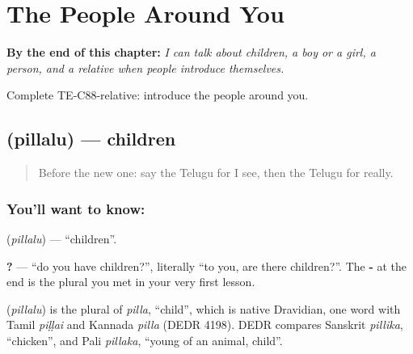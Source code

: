 
\chapter{The People Around You}
\label{ch:te-people}

\begin{chapteropening}
\textbf{By the end of this chapter:} \emph{I can talk about children, a boy or a girl, a person, and a relative when people introduce themselves.}

Complete TE-C88-relative: introduce the people around you.
\end{chapteropening}

\section[\texorpdfstring{\te{పిల్లలు} (pillalu)}{పిల్లలు (pillalu)}]{ (pillalu) — children}

\label{lesson:TE-C88-children}



\begin{quote}
Before the new one: say the Telugu for I see, then the Telugu for really.
\end{quote}

\subsection*{You'll want to know: }
\textbf{} (\emph{pillalu}) — \textquotedblleft{}children\textquotedblright{}.

\textbf{  ?} — \textquotedblleft{}do you have children?\textquotedblright{}, literally \textquotedblleft{}to you, are there children?\textquotedblright{}. The \textbf{-} at the end is the plural you met in your very first lesson.

\begin{cousinweb}
\textbf{} (\emph{pillalu}) is the plural of \emph{pilla}, \textquotedblleft{}child\textquotedblright{}, which is native Dravidian, one word with Tamil \emph{piḷḷai} and Kannada \emph{pilla} (DEDR 4198). DEDR compares Sanskrit \emph{pillika}, \textquotedblleft{}chicken\textquotedblright{}, and Pali \emph{pillaka}, \textquotedblleft{}young of an animal, child\textquotedblright{}.
\end{cousinweb}

